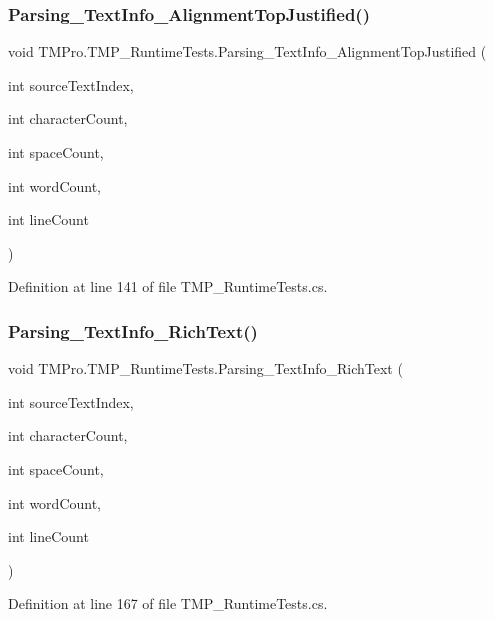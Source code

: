 \subsubsection{\texorpdfstring{Parsing\_TextInfo\_AlignmentTopJustified()}{Parsing\_TextInfo\_AlignmentTopJustified()}}
{\footnotesize\ttfamily void T\+M\+Pro.\+T\+M\+P\+\_\+\+Runtime\+Tests.\+Parsing\+\_\+\+Text\+Info\+\_\+\+Alignment\+Top\+Justified (\begin{DoxyParamCaption}\item[{int}]{source\+Text\+Index,  }\item[{int}]{character\+Count,  }\item[{int}]{space\+Count,  }\item[{int}]{word\+Count,  }\item[{int}]{line\+Count }\end{DoxyParamCaption})}



Definition at line 141 of file T\+M\+P\+\_\+\+Runtime\+Tests.\+cs.

\mbox{\label{class_t_m_pro_1_1_t_m_p___runtime_tests_a283147fa72ae8e15d16ea84b389271a0}} 
\subsubsection{\texorpdfstring{Parsing\_TextInfo\_RichText()}{Parsing\_TextInfo\_RichText()}}
{\footnotesize\ttfamily void T\+M\+Pro.\+T\+M\+P\+\_\+\+Runtime\+Tests.\+Parsing\+\_\+\+Text\+Info\+\_\+\+Rich\+Text (\begin{DoxyParamCaption}\item[{int}]{source\+Text\+Index,  }\item[{int}]{character\+Count,  }\item[{int}]{space\+Count,  }\item[{int}]{word\+Count,  }\item[{int}]{line\+Count }\end{DoxyParamCaption})}



Definition at line 167 of file T\+M\+P\+\_\+\+Runtime\+Tests.\+cs.

\mbox{\label{class_t_m_pro_1_1_t_m_p___runtime_tests_ad1cc7bb34ebedc169d5e61d1f729c429}} 
